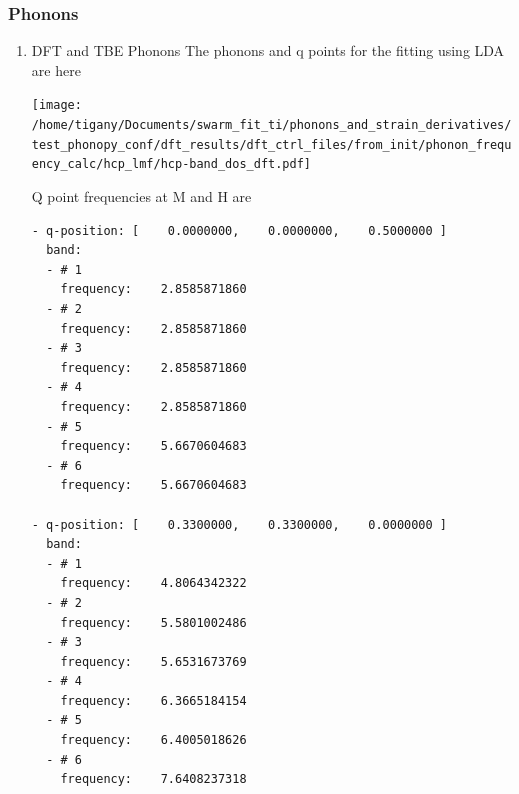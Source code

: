 \documentclass[11pt]{article}
\begin{document}
\subsubsection{Phonons}
\label{sec:org9a76a65}

\begin{enumerate}
\item DFT and TBE Phonons
\label{sec:org9b191a5}
The phonons and q points for the fitting using LDA are here
\begin{center}
\texttt{[image: /home/tigany/Documents/swarm\_fit\_ti/phonons\_and\_strain\_derivatives/test\_phonopy\_conf/dft\_results/dft\_ctrl\_files/from\_init/phonon\_frequency\_calc/hcp\_lmf/hcp-band\_dos\_dft.pdf]}
\end{center}
Q point frequencies at M and H are 
\begin{verbatim}
- q-position: [    0.0000000,    0.0000000,    0.5000000 ]
  band:
  - # 1
    frequency:    2.8585871860
  - # 2
    frequency:    2.8585871860
  - # 3
    frequency:    2.8585871860
  - # 4
    frequency:    2.8585871860
  - # 5
    frequency:    5.6670604683
  - # 6
    frequency:    5.6670604683

- q-position: [    0.3300000,    0.3300000,    0.0000000 ]
  band:
  - # 1
    frequency:    4.8064342322
  - # 2
    frequency:    5.5801002486
  - # 3
    frequency:    5.6531673769
  - # 4
    frequency:    6.3665184154
  - # 5
    frequency:    6.4005018626
  - # 6
    frequency:    7.6408237318

\end{verbatim}
\end{enumerate}
\end{document}
